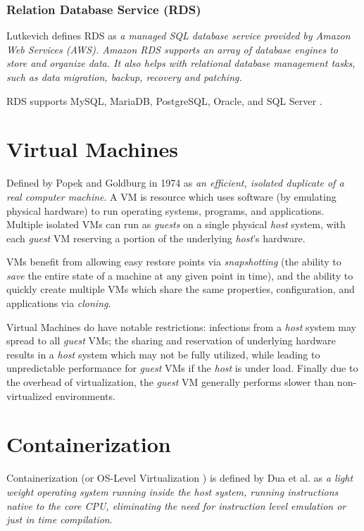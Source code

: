 \subsubsection{Relation Database Service (RDS)}
Lutkevich \cite{lutkevich_2021} defines RDS as \emph{a managed SQL database service provided by Amazon Web Services (AWS). Amazon RDS supports an array of database engines to store and organize data. 
It also helps with relational database management tasks, such as data migration, backup, recovery and patching.}

RDS supports MySQL, MariaDB, PostgreSQL, Oracle, and SQL Server \cite{beach2019relational}.

\section{Virtual Machines}
Defined by Popek and Goldburg in 1974 as \emph{an efficient, isolated duplicate of a real computer machine}\cite{popek_1974}. 
A VM is resource which uses software (by emulating physical hardware) to run operating systems, programs, and applications. 
Multiple isolated VMs can run as \textit{guests} on a single physical \textit{host} system, with each \textit{guest} VM reserving a portion of the underlying
\textit{host}'s hardware. 

VMs benefit from allowing easy restore points via \textit{snapshotting} (the ability to \textit{save} the entire state of a machine at any given point in time), 
and the ability to quickly create multiple VMs which share the same properties, configuration, and applications via \textit{cloning}\cite{n-able_2021}. 

Virtual Machines do have notable restrictions: infections from a \textit{host} system may spread to all \textit{guest} VMs;
the sharing and reservation of underlying hardware results in a \textit{host} system which may not be fully utilized, 
while leading to unpredictable performance for \textit{guest} VMs if the \textit{host} is under load. 
Finally due to the overhead of virtualization, the \textit{guest} VM generally performs slower than non-virtualized environments\cite{Martinovic}.

\section{Containerization}

Containerization (or OS-Level Virtualization \cite{10.5555/1571423}) is defined by Dua et al. as 
\emph{a light weight operating system running inside the host system, running instructions native to the core
CPU, eliminating the need for instruction level emulation or just in time compilation}\cite{6903537}.

